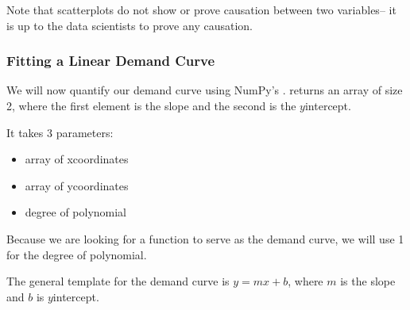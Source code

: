 \documentclass[letterpaper,10pt,english]{jupyterBook}
\begin{document}
\sphinxAtStartPar
Note that scatterplots do not show or prove causation between two variables– it is up to the data scientists to prove any causation.


\subsubsection{Fitting a Linear Demand Curve}
\label{\detokenize{content/01-demand/02-example:fitting-a-linear-demand-curve}}
\sphinxAtStartPar
We will now quantify our demand curve using NumPy’s .  returns an array of size 2, where the first element is the slope and the second is the \(y\)\sphinxhyphen{}intercept.

\sphinxAtStartPar
It takes 3 parameters:
\begin{itemize}
\item {} 
\sphinxAtStartPar
array of x\sphinxhyphen{}coordinates

\item {} 
\sphinxAtStartPar
array of y\sphinxhyphen{}coordinates

\item {} 
\sphinxAtStartPar
degree of polynomial

\end{itemize}

\sphinxAtStartPar
Because we are looking for a  function to serve as the demand curve, we will use 1 for the degree of polynomial.

\sphinxAtStartPar
The general template for the demand curve is \(y = mx + b\), where \(m\) is the slope and \(b\) is \(y\)\sphinxhyphen{}intercept.
\end{document}
